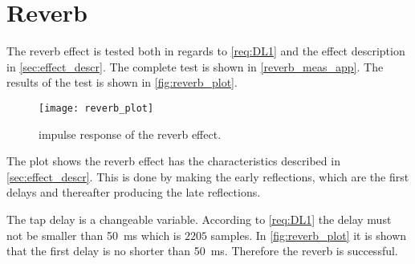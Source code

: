 \section{Reverb}
The reverb effect is tested both in regards to \autoref{req:DL1} and the effect description in \autoref{sec:effect_descr}.
The complete test is shown in \autoref{reverb_meas_app}. The results of the test is shown in \autoref{fig:reverb_plot}.

\begin{figure}[hbpt]
	\centering
	\texttt{[image: reverb\_plot]}
	\caption{impulse response of the reverb effect.}
	\label{fig:reverb_plot}
\end{figure}

The plot shows the reverb effect has the characteristics described in \autoref{sec:effect_descr}. This is done by making the early reflections, which are the first delays and thereafter producing the late reflections.

The tap delay is a changeable variable. According to \autoref{req:DL1} the delay must not be smaller than \SI{50}{\milli\second} which is $2205$ samples. In \autoref{fig:reverb_plot} it is shown that the first delay is no shorter than \SI{50}{\milli\second}. Therefore the reverb is successful. 